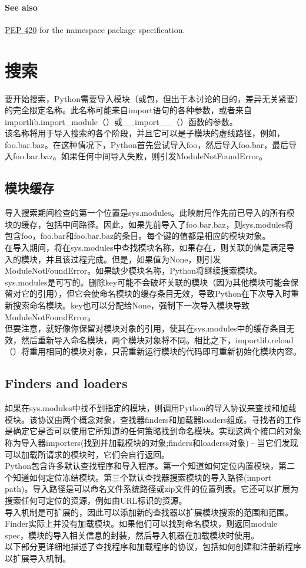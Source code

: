 \documentclass[10pt,UTF8]{ctexart}
\begin{document}
\paragraph{See also}\href{https://www.python.org/dev/peps/pep-0420/}{PEP 420} for the namespace package specification.

\section{搜索}
要开始搜索，Python需要导入模块（或包，但出于本讨论的目的，差异无关紧要）的完全限定名称。此名称可能来自import语句的各种参数，或者来自importlib.import_module（）或__import__（）函数的参数。\\
\indent 该名称将用于导入搜索的各个阶段，并且它可以是子模块的虚线路径，例如， foo.bar.baz。在这种情况下，Python首先尝试导入foo，然后导入foo.bar，最后导入foo.bar.baz。如果任何中间导入失败，则引发ModuleNotFoundError。
\subsection{模块缓存}
导入搜索期间检查的第一个位置是sys.modules。此映射用作先前已导入的所有模块的缓存，包括中间路径。因此，如果先前导入了foo.bar.baz，则sys.modules将包含foo，foo.bar和foo.bar.baz的条目。每个键的值都是相应的模块对象。\\
\indent 在导入期间，将在sys.modules中查找模块名称，如果存在，则关联的值是满足导入的模块，并且该过程完成。但是，如果值为None，则引发ModuleNotFoundError。如果缺少模块名称，Python将继续搜索模块。\\
\indent sys.modules是可写的。删除key可能不会破坏关联的模块（因为其他模块可能会保留对它的引用），但它会使命名模块的缓存条目无效，导致Python在下次导入时重新搜索命名模块。key也可以分配给None，强制下一次导入模块导致ModuleNotFoundError。\\
\indent 但要注意，就好像你保留对模块对象的引用，使其在sys.modules中的缓存条目无效，然后重新导入命名模块，两个模块对象将不同。相比之下，importlib.reload（）将重用相同的模块对象，只需重新运行模块的代码即可重新初始化模块内容。
\subsection{Finders and loaders}
如果在sys.modules中找不到指定的模块，则调用Python的导入协议来查找和加载模块。该协议由两个概念对象，查找器finders和加载器loaders组成。寻找者的工作是确定它是否可以使用它所知道的任何策略找到命名模块。实现这两个接口的对象称为导入器importers(找到并加载模块的对象;finders和loaderss对象) - 当它们发现可以加载所请求的模块时，它们会自行返回。\\
\indent Python包含许多默认查找程序和导入程序。第一个知道如何定位内置模块，第二个知道如何定位冻结模块。第三个默认查找器搜索模块的导入路径(import path)。导入路径是可以命名文件系统路径或zip文件的位置列表。它还可以扩展为搜索任何可定位的资源，例如由URL标识的资源。\\
\indent 导入机制是可扩展的，因此可以添加新的查找器以扩展模块搜索的范围和范围。\\
\indent Finder实际上并没有加载模块。如果他们可以找到命名模块，则返回module spec，模块的导入相关信息的封装，然后导入机器在加载模块时使用。\\
\indent 以下部分更详细地描述了查找程序和加载程序的协议，包括如何创建和注册新程序以扩展导入机制。
\end{document}
